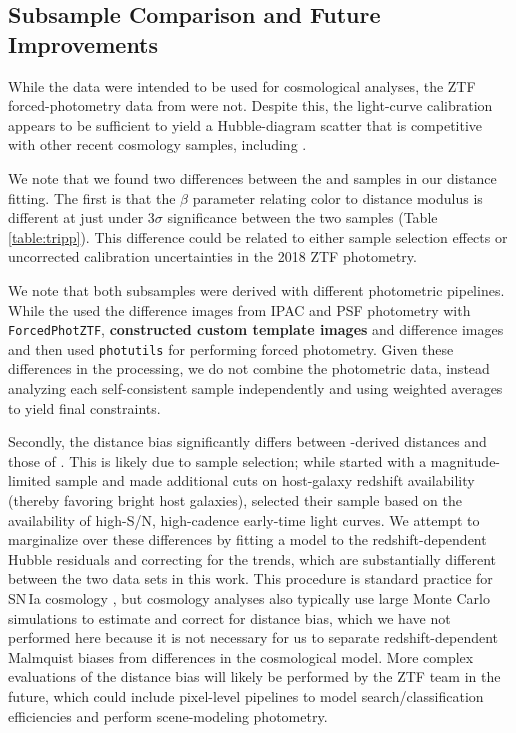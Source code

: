 \documentclass[twocolumn,twocolappendix, linenumbers]{aastex631} %
\begin{document}
\subsection{Subsample Comparison and Future Improvements}

While the \citet{Dhawan22} data were intended to be used for cosmological analyses, the ZTF forced-photometry data from \citet{Yao19} were not.  Despite this, the light-curve calibration appears to be sufficient to yield a Hubble-diagram scatter that is competitive with other recent cosmology samples, including \citet{Dhawan22}.

We note that we found two differences between the \citet{Yao19} and \citet{Dhawan22} samples in our distance fitting. The first is that the $\beta$ parameter relating color to distance modulus is different at just under 3$\sigma$ significance between the two samples (Table \ref{table:tripp}).
This difference could be related to either sample selection effects or uncorrected calibration uncertainties in the 2018 ZTF photometry.

We note that both subsamples were derived with different photometric pipelines. While the \citet{Yao19} used the difference images from IPAC \citep[e.g., see][]{Masci19} and PSF photometry with \texttt{ForcedPhotZTF}, {\bf \citet{Dhawan22} constructed custom template images} and difference images and then used \texttt{photutils} \citep{larry_bradley_2023_7946442} for performing forced photometry. Given these differences in the processing,  we do not combine the photometric data, instead analyzing each self-consistent sample independently and using weighted averages to yield final constraints.

Secondly, the distance bias significantly differs between \citet{Yao19}-derived distances and those of \citet{Dhawan22}.  This is likely due to sample selection; while \citet{Dhawan22} started with a magnitude-limited sample and made additional cuts on host-galaxy redshift availability (thereby favoring bright host galaxies), \citet{Yao19} selected their sample based on the availability of high-S/N, high-cadence early-time light curves.  We attempt to marginalize over these differences by fitting a model to the redshift-dependent Hubble residuals and correcting for the trends, which are substantially different between the two data sets in this work.  This procedure is standard practice for SN\,Ia cosmology \citep[e.g.,][]{Marriner11}, but cosmology analyses also typically use large Monte Carlo simulations to estimate and correct for distance bias, which we have not performed here because it is not necessary for us to separate redshift-dependent Malmquist biases from differences in the cosmological model.  More complex evaluations of the distance bias will likely be performed by the ZTF team in the future, which could include pixel-level pipelines to model search/classification efficiencies and perform scene-modeling photometry.
\end{document}
